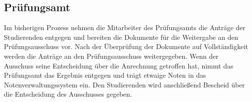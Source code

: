 \subsection{Prüfungsamt}

Im bisherigen Prozess nehmen die Mitarbeiter des Prüfungsamts die Anträge der Studierenden entgegen und bereiten die Dokumente für die Weitergabe an den Prüfungsausschuss vor. Nach der Überprüfung der Dokumente auf Vollständigkeit werden die Anträge an den Prüfungsausschuss weitergegeben. Wenn der Ausschuss seine Entscheidung über die Anrechnung getroffen hat, nimmt das Prüfungsamt das Ergebnis entgegen und trägt etwaige Noten in das Notenverwaltungssystem ein. Den Studierenden wird anschließend Bescheid über die Entscheidung des Ausschusses gegeben.
